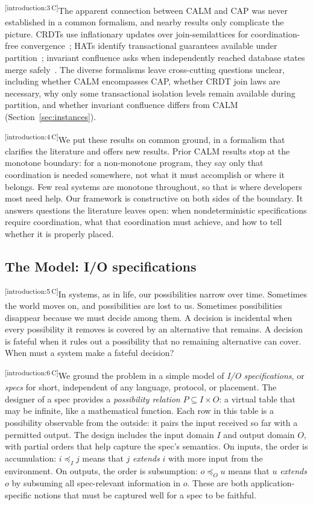 \documentclass[sigconf]{cidr-2027}
\theoremstyle{remark}
\newcommand{\InputOrd}{\preceq_I}
\newcommand{\OutputOrd}{\preceq_O}
\newcommand{\inrel}{extends\xspace}          %
\newcommand{\outrel}{extends\xspace}          %
\newcommand{\spectype}[1][]{I/O specification#1\xspace}
\newcommand{\Spectype}[1][]{I/O specification#1\xspace}
\newcommand{\cxtag}[2]{\textsuperscript{\textsf{\tiny[#1\,#2]}}}
\begin{document}
\color{black!45}\cxtag{introduction:3}{C}The apparent connection between CALM and CAP was never established in a common
formalism, and nearby results only complicate the picture. CRDTs use
inflationary updates over join-semilattices for coordination-free
convergence~\cite{shapiro2011crdt}; HATs identify transactional guarantees
available under partition~\cite{bailis2013hat}; invariant confluence asks when
independently reached database states merge
safely~\cite{bailis2014coordination}. The diverse formalisms leave cross-cutting
questions unclear, including whether CALM encompasses CAP, whether CRDT join
laws are necessary, why only some transactional isolation levels remain
available during partition, and whether invariant confluence differs from CALM
(Section~\ref{sec:instances}).\color{black}

\color{black!45}\cxtag{introduction:4}{C}We put these results on common ground, in a formalism that clarifies the
literature and offers new results.  Prior CALM results stop at the monotone
boundary: for a non-monotone program, they say only that coordination is needed
somewhere, not what it must accomplish or where it belongs.  Few real systems
are monotone throughout, so that is where developers most need help.  Our
framework is constructive on both sides of the boundary.  It answers questions
the literature leaves open: when nondeterministic specifications require
coordination, what that coordination must achieve, and how to tell whether it is
properly placed.\color{black}

\subsection{The Model: \Spectype[s]}
\color{black!45}\cxtag{introduction:5}{C}In systems, as in life, our possibilities narrow over time. Sometimes the world
moves on, and possibilities are lost to us. Sometimes possibilities disappear
because we must decide among them. A decision is incidental when
every possibility it removes is covered by an alternative that remains. A
decision is fateful when it rules out a possibility that no remaining
alternative can cover. When must a system make a fateful decision?\color{black}

\color{black!45}\cxtag{introduction:6}{C}We ground the problem in a simple model of \emph{\spectype[s]}, or \emph{specs}
for short, independent of any language, protocol, or placement. The designer of
a spec provides a \emph{possibility relation} $P\subseteq I\times O$: a virtual
table that may be infinite, like a mathematical function. Each row in this table
is a possibility observable from the outside: it pairs the input received so far
with a permitted output. The design includes the input domain $I$ and output domain $O$,
with partial orders that help capture the spec's semantics.  On inputs, the order
is accumulation: $i\InputOrd j$ means that $j$ \emph{\inrel} $i$ with more input
from the environment.  On outputs, the order is subsumption: $o\OutputOrd u$
means that  $u$ \emph{\outrel} $o$ by subsuming all spec-relevant information in
$o$. These are both application-specific notions that must be captured well for
a spec to be faithful.\color{black}
\end{document}
